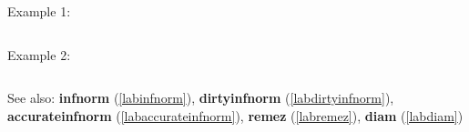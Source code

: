 \noindent Example 1: 
\begin{center}\begin{minipage}{15cm}\begin{Verbatim}[frame=single]
\end{Verbatim}
\end{minipage}\end{center}
\noindent Example 2: 
\begin{center}\begin{minipage}{15cm}\begin{Verbatim}[frame=single]
\end{Verbatim}
\end{minipage}\end{center}
See also: \textbf{infnorm} (\ref{labinfnorm}), \textbf{dirtyinfnorm} (\ref{labdirtyinfnorm}), \textbf{accurateinfnorm} (\ref{labaccurateinfnorm}), \textbf{remez} (\ref{labremez}), \textbf{diam} (\ref{labdiam})
